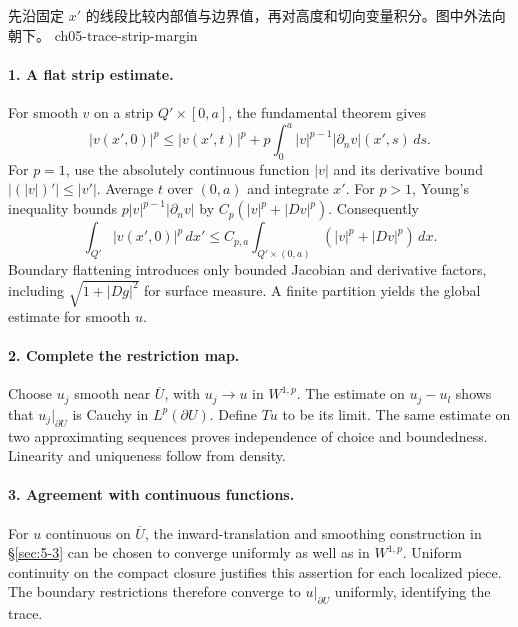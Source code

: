 \begin{expandedproof}

{先沿固定 $x'$ 的线段比较内部值与边界值，再对高度和切向变量积分。图中外法向朝下。}
{ch05-trace-strip-margin}

\paragraph{1. A flat strip estimate.}
For smooth $v$ on a strip $Q'\times[0,a]$, the fundamental theorem gives
\[
 |v(x',0)|^p
 \leq |v(x',t)|^p+
 p\int_0^a|v|^{p-1}|\partial_n v|(x',s)\,ds.
\]
For $p=1$, use the absolutely continuous function $|v|$ and its
derivative bound $|(|v|)'|\leq|v'|$.
Average $t$ over $(0,a)$ and integrate $x'$.
For $p>1$, Young's inequality bounds
$p|v|^{p-1}|\partial_n v|$ by $C_p(|v|^p+|Dv|^p)$.
Consequently
\[
 \int_{Q'}|v(x',0)|^p\,dx'
 \leq C_{p,a}\int_{Q'\times(0,a)}(|v|^p+|Dv|^p)\,dx.
\]
Boundary flattening introduces only bounded Jacobian and derivative
factors, including $\sqrt{1+|Dg|^2}$ for surface measure.
A finite partition yields the global estimate for smooth $u$.

\paragraph{2. Complete the restriction map.}
Choose $u_j$ smooth near $\overline U$, with $u_j\to u$ in $W^{1,p}$.
The estimate on $u_j-u_l$ shows that $u_j|_{\partial U}$ is Cauchy in
$L^p(\partial U)$. Define $Tu$ to be its limit. The same estimate on
two approximating sequences proves independence of choice and boundedness.
Linearity and uniqueness follow from density.

\paragraph{3. Agreement with continuous functions.}
For $u$ continuous on $\overline U$, the inward-translation and smoothing
construction in \S\ref{sec:5-3} can be chosen to converge uniformly as
well as in $W^{1,p}$. Uniform continuity on the compact closure justifies
this assertion for each localized piece. The boundary restrictions
therefore converge to $u|_{\partial U}$ uniformly, identifying the trace.
\end{expandedproof}
\Needspace{45mm}

